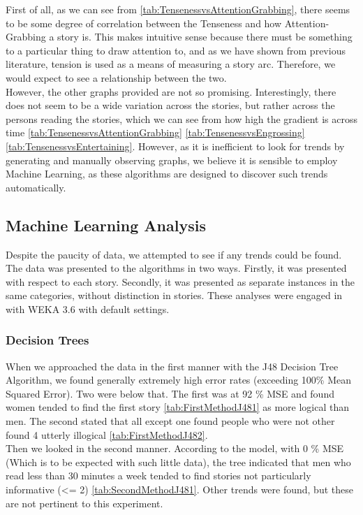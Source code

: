 \documentclass[11pt]{article}
\begin{document}
First of all, as we can see from \ref{tab:TensenessvsAttentionGrabbing}, there seems to be some degree of correlation between the Tenseness and how Attention-Grabbing a story is. This makes intuitive sense because there must be something to a particular thing to draw attention to, and as we have shown from previous literature, tension is used as a means of measuring a story arc. Therefore, we would expect to see a relationship between the two.\\

However, the other graphs provided are not so promising. Interestingly, there does not seem to be a wide variation across the stories, but rather across the persons reading the stories, which we can see from how high the gradient is across time \ref{tab:TensenessvsAttentionGrabbing} \ref{tab:TensenessvsEngrossing} \ref{tab:TensenessvsEntertaining}. However, as it is inefficient to look for trends by generating and manually observing graphs, we believe it is sensible to employ Machine Learning, as these algorithms are designed to discover such trends automatically.\\
\subsection{Machine Learning Analysis}
Despite the paucity of data, we attempted to see if any trends could be found. The data was presented to the algorithms in two ways. Firstly, it was presented with respect to each story. Secondly, it was presented as separate instances in the same categories, without distinction in stories. These analyses were engaged in with WEKA 3.6 with default settings.\\
\subsubsection{Decision Trees}
When we approached the data in the first manner with the J48 Decision Tree Algorithm, we found generally extremely high error rates (exceeding 100\% Mean Squared Error). Two were below that. The first was at 92 \% MSE and found women tended to find the first story \ref{tab:FirstMethodJ481} as more logical than men. The second stated that all except one found people who were not other found 4 utterly illogical \ref{tab:FirstMethodJ482}.\\
Then we looked in the second manner. According to the model, with 0 \% MSE (Which is to be expected with such little data), the tree indicated that men who read less than 30 minutes a week tended to find stories not particularly informative (<= 2) \ref{tab:SecondMethodJ481}. Other trends were found, but these are not pertinent to this experiment.\\
\end{document}
